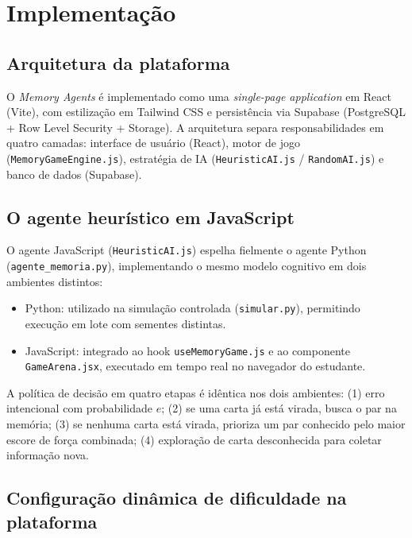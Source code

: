 \documentclass[
    12pt,
    openright,
    twoside,
    a4paper,
    english,
    brazil
]{abntex2}
\begin{document}
\chapter{Implementação}

\section{Arquitetura da plataforma}

O \textit{Memory Agents} é implementado como uma \textit{single-page application} em React (Vite), com estilização em Tailwind CSS e persistência via Supabase (PostgreSQL + Row Level Security + Storage). A arquitetura separa responsabilidades em quatro camadas: interface de usuário (React), motor de jogo (\texttt{MemoryGameEngine.js}), estratégia de IA (\texttt{HeuristicAI.js} / \texttt{RandomAI.js}) e banco de dados (Supabase).

\section{O agente heurístico em JavaScript}

O agente JavaScript (\texttt{HeuristicAI.js}) espelha fielmente o agente Python (\texttt{agente\_memoria.py}), implementando o mesmo modelo cognitivo em dois ambientes distintos:

\begin{itemize}
  \item Python: utilizado na simulação controlada (\texttt{simular.py}), permitindo execução em lote com sementes distintas.
  \item JavaScript: integrado ao hook \texttt{useMemoryGame.js} e ao componente \texttt{GameArena.jsx}, executado em tempo real no navegador do estudante.
\end{itemize}

A política de decisão em quatro etapas é idêntica nos dois ambientes: (1) erro intencional com probabilidade $e$; (2) se uma carta já está virada, busca o par na memória; (3) se nenhuma carta está virada, prioriza um par conhecido pelo maior escore de força combinada; (4) exploração de carta desconhecida para coletar informação nova.

\section{Configuração dinâmica de dificuldade na plataforma}
\end{document}
